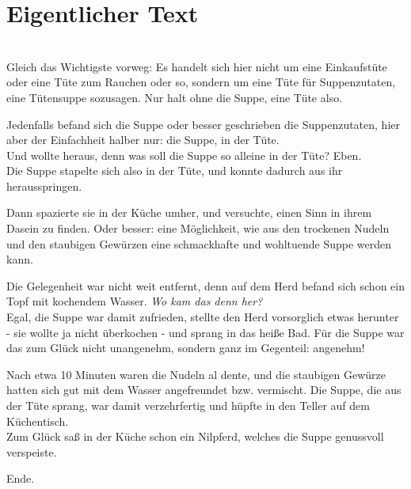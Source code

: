 \chapter{Eigentlicher Text}
\label{chp:text}

\\

Gleich das Wichtigste vorweg: Es handelt sich hier nicht um eine
Einkaufst\"ute oder eine T\"ute zum Rauchen oder so, sondern um eine
T\"ute f\"ur Suppenzutaten, eine T\"utensuppe sozusagen. Nur halt ohne
die Suppe, eine T\"ute also.

Jedenfalls befand sich die Suppe oder besser geschrieben die
Suppenzutaten, hier aber der Einfachheit halber nur: die Suppe, in der T\"ute.\\
Und wollte heraus, denn was soll die Suppe so alleine in der T\"ute? Eben.\\
Die Suppe stapelte sich also in der T\"ute, und konnte dadurch aus ihr
herausspringen.

Dann spazierte sie in der K\"uche umher, und versuchte, einen Sinn in
ihrem Dasein zu finden. Oder besser: eine M\"oglichkeit, wie aus den
trockenen Nudeln und den staubigen Gew\"urzen eine schmackhafte und
wohltuende Suppe werden kann.

Die Gelegenheit war nicht weit entfernt, denn auf dem Herd befand sich
schon ein Topf mit kochendem Wasser. \textit{Wo kam das denn her?}\\
Egal, die Suppe war damit zufrieden, stellte den Herd vorsorglich
etwas herunter - sie wollte ja nicht \"uberkochen - und sprang in das
hei\ss{}e Bad. F\"ur die Suppe war das zum Gl\"uck nicht unangenehm,
sondern ganz im Gegenteil: angenehm!

Nach etwa 10 Minuten waren die Nudeln al dente, und die staubigen
Gew\"urze hatten sich gut mit dem Wasser angefreundet bzw. vermischt.
Die Suppe, die aus der T\"ute sprang, war damit verzehrfertig und
h\"upfte in den Teller auf dem K\"uchentisch.\\
Zum Gl\"uck sa\ss{} in der K\"uche schon ein Nilpferd, welches die Suppe
genussvoll verspeiste.

Ende.

